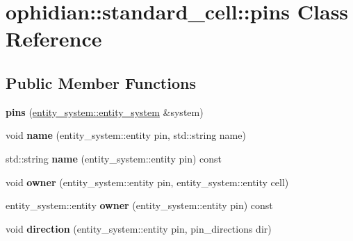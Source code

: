 \hypertarget{classophidian_1_1standard__cell_1_1pins}{\section{ophidian\-:\-:standard\-\_\-cell\-:\-:pins Class Reference}
\label{classophidian_1_1standard__cell_1_1pins}
}
\subsection*{Public Member Functions}
\begin{DoxyCompactItemize}
\item 
\hypertarget{classophidian_1_1standard__cell_1_1pins_a62ccfd952d522f72f67d337018b7ccdb}{{\bfseries pins} (\hyperlink{classophidian_1_1entity__system_1_1entity__system}{entity\-\_\-system\-::entity\-\_\-system} \&system)}\label{classophidian_1_1standard__cell_1_1pins_a62ccfd952d522f72f67d337018b7ccdb}

\item 
\hypertarget{classophidian_1_1standard__cell_1_1pins_a9e636ecfcf0369c72cf6215c6774d6be}{void {\bfseries name} (entity\-\_\-system\-::entity pin, std\-::string name)}\label{classophidian_1_1standard__cell_1_1pins_a9e636ecfcf0369c72cf6215c6774d6be}

\item 
\hypertarget{classophidian_1_1standard__cell_1_1pins_a950dd581da436201df5d7f8b7cd0cc2c}{std\-::string {\bfseries name} (entity\-\_\-system\-::entity pin) const }\label{classophidian_1_1standard__cell_1_1pins_a950dd581da436201df5d7f8b7cd0cc2c}

\item 
\hypertarget{classophidian_1_1standard__cell_1_1pins_a5feae27c9e618700fdee41cf8f6d9d2b}{void {\bfseries owner} (entity\-\_\-system\-::entity pin, entity\-\_\-system\-::entity cell)}\label{classophidian_1_1standard__cell_1_1pins_a5feae27c9e618700fdee41cf8f6d9d2b}

\item 
\hypertarget{classophidian_1_1standard__cell_1_1pins_a8c9bd69b75fe0e46ecfcd0693c022c31}{entity\-\_\-system\-::entity {\bfseries owner} (entity\-\_\-system\-::entity pin) const }\label{classophidian_1_1standard__cell_1_1pins_a8c9bd69b75fe0e46ecfcd0693c022c31}

\item 
\hypertarget{classophidian_1_1standard__cell_1_1pins_a7b15fb351af9fda98295f315b371f601}{void {\bfseries direction} (entity\-\_\-system\-::entity pin, pin\-\_\-directions dir)}\label{classophidian_1_1standard__cell_1_1pins_a7b15fb351af9fda98295f315b371f601}


\end{DoxyCompactItemize}
